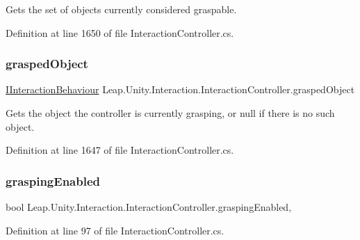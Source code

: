 Gets the set of objects currently considered graspable. 



Definition at line 1650 of file Interaction\+Controller.\+cs.

\mbox{\label{class_leap_1_1_unity_1_1_interaction_1_1_interaction_controller_aecfb55af7f506df76774eac811ad25fc}} 
\subsubsection{\texorpdfstring{graspedObject}{graspedObject}}
{\footnotesize\ttfamily \mbox{\hyperlink{interface_leap_1_1_unity_1_1_interaction_1_1_i_interaction_behaviour}{I\+Interaction\+Behaviour}} Leap.\+Unity.\+Interaction.\+Interaction\+Controller.\+grasped\+Object\hspace{0.3cm}{\ttfamily [get]}}



Gets the object the controller is currently grasping, or null if there is no such object. 



Definition at line 1647 of file Interaction\+Controller.\+cs.

\mbox{\label{class_leap_1_1_unity_1_1_interaction_1_1_interaction_controller_aa8c6c126e8c40ce9874739f531c7f53f}} 
\subsubsection{\texorpdfstring{graspingEnabled}{graspingEnabled}}
{\footnotesize\ttfamily bool Leap.\+Unity.\+Interaction.\+Interaction\+Controller.\+grasping\+Enabled\hspace{0.3cm}{\ttfamily [get]}, {\ttfamily [set]}}



Definition at line 97 of file Interaction\+Controller.\+cs.

